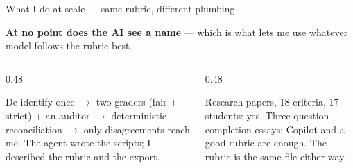 \documentclass[aspectratio=169, 10pt]{beamer}
\begin{document}
\begin{frame}{What I do at scale --- same rubric, different plumbing}
\begin{center}
\end{center}
\vskip3pt
\begin{tcolorbox}[accentbox, top=2pt, bottom=2pt]
\centering\small \textbf{At no point does the AI see a name} --- which is what lets me use whatever model follows the rubric best.
\end{tcolorbox}
\vskip2pt
\begin{columns}[T]
\begin{column}{0.48\textwidth}
\begin{tcolorbox}[pipelinebox, title={\faUsers\quad Why the plumbing}]
\scriptsize
De-identify once $\rightarrow$ two graders (fair + strict) + an auditor $\rightarrow$ deterministic reconciliation $\rightarrow$ only disagreements reach me. The agent wrote the scripts; I described the rubric and the export.
\end{tcolorbox}
\end{column}
\begin{column}{0.48\textwidth}
\begin{tcolorbox}[pipelinebox, title={\faBalanceScale\quad When it's worth it}]
\scriptsize
Research papers, 18 criteria, 17 students: yes. Three-question completion essays: Copilot and a good rubric are enough. The rubric is the same file either way.
\end{tcolorbox}
\end{column}
\end{columns}
\end{frame}

\fi
\end{document}
